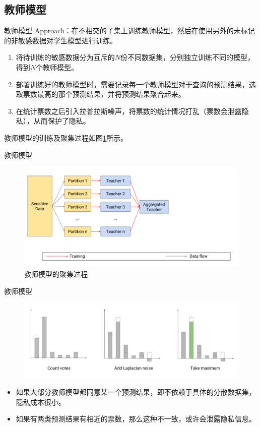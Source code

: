 \documentclass[aspectratio=169]{beamer}
\begin{document}
\subsection{教师模型}
\begin{frame}{教师模型}
Approach：在不相交的子集上训练教师模型，然后在使用另外的未标记的非敏感数据对学生模型进行训练。
\begin{enumerate}
\item 将待训练的敏感数据分为互斥的$N$份不同数据集，分别独立训练不同的模型，得到$N$个教师模型。
\item 部署训练好的教师模型时，需要记录每一个教师模型对于查询的预测结果，选取票数最高的那个预测结果，并将预测结果聚合起来。
\item 在统计票数之后引入拉普拉斯噪声，将票数的统计情况打乱（票数会泄露隐私），从而保护了隐私。
\end{enumerate}

教师模型的训练及聚集过程如图\ref*{fig:teacher-model}所示。
\end{frame}

\begin{frame}{教师模型}
\begin{figure}[!h]
\includegraphics[width = \linewidth]{fig/teacher-model.png}
\caption{教师模型的聚集过程}
\label{fig:teacher-model}
\end{figure}
\end{frame}

\begin{frame}{教师模型}
\begin{figure}[!h]
\includegraphics[width = \linewidth]{fig/aggergation.png}
\label{fig:aggergation}
\end{figure}
\begin{itemize}
\item 如果大部分教师模型都同意某一个预测结果，即不依赖于具体的分散数据集，隐私成本很小。
\item 如果有两类预测结果有相近的票数，那么这种不一致，或许会泄露隐私信息。
\end{itemize}
\end{frame}
\end{document}
